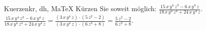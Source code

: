 \begin{MAufgabe}{Kuerzen}{kr, dh, MaTeX}
K\"urzen Sie soweit m\"oglich: $\frac{15\, x\, y^4\, z^3 - 6\, x\, y^4\, z}{18\, x\, y^4\, z^4 + 24\, x\, y^4\, z}$.\\ 
\ifLsg\MLoesung
\quad $\frac{15\, x\, y^4\, z^3 - 6\, x\, y^4\, z}{18\, x\, y^4\, z^4 + 24\, x\, y^4\, z}=\frac{(3\, x\, y^4\, z)\cdot(5\, z^2 - 2)}{(3\, x\, y^4\, z)\cdot(6\, z^3 + 8)}=\frac{5\, z^2 - 2}{6\, z^3 + 8}$.\else\relax\fi
 \end{MAufgabe}